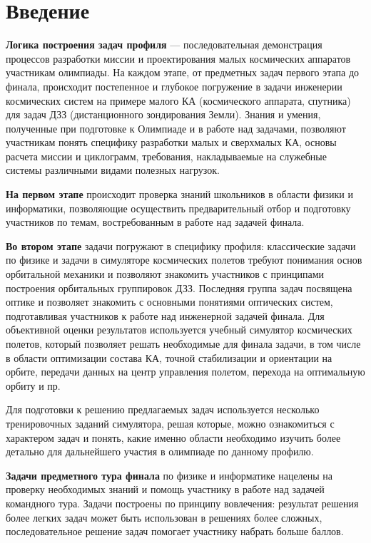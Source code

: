 
%

\begingroup
\pagestyle{empty}

\section*{Введение}

\textbf{Логика построения задач профиля} — последовательная демонстрация процессов разработки миссии и проектирования малых космических аппаратов участникам олимпиады. На каждом этапе, от предметных задач первого этапа до финала, происходит постепенное и глубокое погружение в задачи инженерии космических систем на примере малого КА (космического аппарата, спутника) для задач ДЗЗ (дистанционного зондирования Земли). Знания и умения, полученные при подготовке к Олимпиаде и в работе над задачами, позволяют участникам понять специфику разработки малых и сверхмалых КА, основы расчета миссии и циклограмм, требования, накладываемые на служебные системы различными видами полезных нагрузок. 

\textbf{На первом этапе} происходит проверка знаний школьников в области физики и информатики, позволяющие осуществить предварительный отбор и подготовку участников по темам, востребованным в работе над задачей финала.

\textbf{Во втором этапе} задачи погружают в специфику профиля: классические задачи по физике и задачи в симуляторе космических полетов требуют понимания основ орбитальной механики и позволяют знакомить участников с принципами построения орбитальных группировок ДЗЗ. Последняя группа задач посвящена оптике и позволяет знакомить с основными понятиями оптических систем, подготавливая участников к работе над инженерной задачей финала. Для объективной оценки результатов используется учебный симулятор космических полетов, который позволяет решать необходимые для финала задачи, в том числе в области оптимизации состава КА, точной стабилизации и ориентации на орбите, передачи данных на центр управления полетом, перехода на оптимальную орбиту и пр.

Для подготовки к решению предлагаемых задач используется несколько тренировочных заданий симулятора, решая которые, можно ознакомиться с характером задач и понять, какие именно области необходимо изучить более детально для дальнейшего участия в олимпиаде по данному профилю.

\textbf{Задачи предметного тура финала} по физике и информатике нацелены на проверку необходимых знаний и помощь участнику в работе над задачей командного тура. Задачи  построены по принципу вовлечения: результат решения более легких задач может быть использован в решениях более сложных, последовательное решение задач помогает участнику набрать больше баллов.


